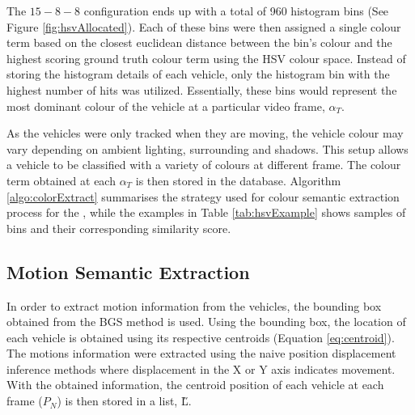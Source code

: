 The $15-8-8$ configuration ends up with a total of 960 histogram bins (See Figure \ref{fig:hsvAllocated}).
Each of these bins were then assigned a single colour term based on the closest euclidean distance between the bin's colour and the highest scoring ground truth colour term using the HSV colour space.
Instead of storing the histogram details of each vehicle, only the histogram bin with the highest number of hits was utilized.
Essentially, these bins would represent the most dominant colour of the vehicle at a particular video frame, $\alpha_T$.

As the vehicles were only tracked when they are moving, the vehicle colour may vary depending on ambient lighting, surrounding and shadows.
This setup allows a vehicle to be classified with a variety of colours at different frame.
The colour term obtained at each $\alpha_T$ is then stored in the database.
Algorithm \ref{algo:colorExtract} summarises the strategy used for colour semantic extraction process for the \versionOneExt,
while the examples in Table \ref{tab:hsvExample} shows samples of bins and their corresponding similarity score.



\subsection{Motion Semantic Extraction}
\label{subsec:motions9binextract}

In order to extract motion information from the vehicles, the bounding box obtained from the BGS method is used.
Using the bounding box, the location of each vehicle is obtained using its respective centroids (Equation \ref{eq:centroid}).
The motions information were extracted using the naive position displacement inference methods where displacement in the X or Y axis indicates movement.
With the obtained information, the centroid position of each vehicle at each frame ($P_N$) is then stored in a list, \H{L}.

